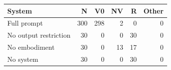 \begin{tabular}{lrrrrr}
\toprule
System & N & V0 & NV & R & Other \\
\midrule
Full prompt & 300 & 298 & 2 & 0 & 0 \\
No output restriction & 30 & 0 & 0 & 30 & 0 \\
No embodiment & 30 & 0 & 13 & 17 & 0 \\
No system & 30 & 0 & 0 & 30 & 0 \\
\bottomrule
\end{tabular}

